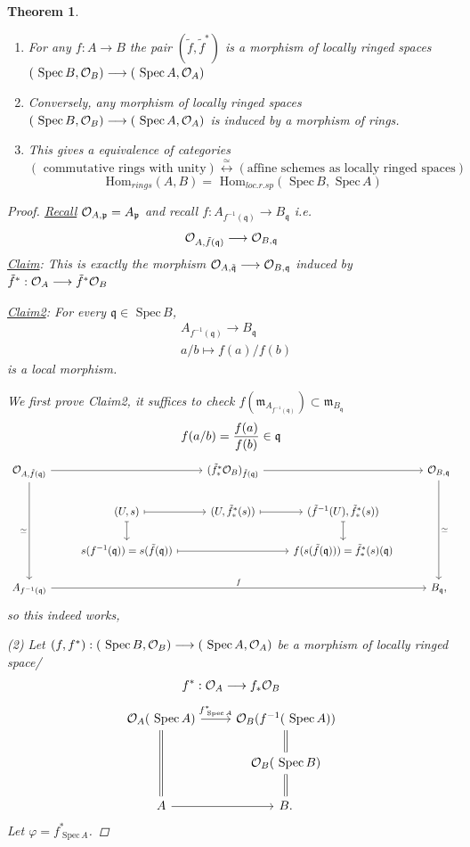 \documentclass[11pt]{article}
\newtheorem{thm}{Theorem}[section]
\renewcommand{\hom}{\text{ Hom}}
\newcommand{\spec}{\text{ Spec}\,}
\newcommand{\scm}{{\mathfrak m}}
\newcommand{\scp}{{\mathfrak p}}
\newcommand{\scq}{\mathfrak q}
\newcommand{\calo}{{\cal O}}
\newcommand{\lrta}{\longrightarrow}
\newcommand{\llrta}{\longleftrightarrow}
\begin{document}
\begin{thm}
\begin{enumerate}[label=(\arabic*)]
\item For any $f: A\lrta B$ the pair $(\tilde{f},\tilde{f}^*)$ is a morphism  of locally ringed spaces $(\spec B,\calo_B)\lrta (\spec A,\calo_A)$
\item Conversely, any morphism of locally ringed spaces $(\spec B,\calo_B)\lrta (\spec A,\calo_A)$ is induced by a morphism of rings.
\item This gives a equivalence of categories
$$
\left( \text{ commutative rings with unity}\right)\overset{\simeq}{\llrta}\left(\text{affine schemes as locally ringed spaces}\right)
$$
$$
\hom_{rings}(A,B)=\hom_{loc.r.sp}(\spec B,\spec A)
$$
\end{enumerate}
\begin{proof}
\underline{Recall} $\calo_{A,\scp}=A_\scp$ and recall $f:A_{f^{-1}(\scq)}\lrta B_\scq$ i.e.
$$
\calo_{A,\tilde{f}(\scq)}\lrta \calo_{B,\scq}
$$
\underline{Claim}: This is exactly the morphism $\calo_{A,\tilde{\scq}}\lrta \calo_{B,\scq}$ induced by $\tilde{f}^*:\calo_A\lrta \tilde{f}^*\calo_B$

\underline{Claim2}: For every $\scq\in\spec B$, 
$$
\begin{aligned}
& A_{f^{-1}(\scq)}\lrta B_\scq\\
&a/b\longmapsto f(a)/f(b)
\end{aligned}
$$
is a local morphism.

We first prove Claim2, it suffices to check $f(\scm_{A_{f^{-1}(\scq)}})\subset \scm_{B_\scq}$
$$
f(a/b)=\frac{f(a)}{f(b)}\in \scq\\
$$
$$
\begin{tikzcd}
\calo_{A,\tilde{f}(\scq)} \arrow[ddd, "\simeq"'] \arrow[rr] &  & (\tilde{f}^*_*\calo_B)_{\tilde{f}(\scq)} \arrow[rr] &  & \calo_{B,\scq} \arrow[ddd, "\simeq"] \\
 & (U,s) \arrow[d, maps to] \arrow[r, maps to] & (U,\tilde{f}^*_*(s)) \arrow[r, maps to] & (\tilde{f}^{-1}(U),\tilde{f}_*^*(s)) \arrow[d, maps to] &  \\
 & s(f^{-1}(\scq))=s(\tilde{f}(\scq)) \arrow[rr, maps to] &  & f(s(\tilde{f}(\scq)))=\tilde{f}^*_*(s)(\scq) &  \\
A_{f^{-1}(\scq)} \arrow[rrrr, "f"] &  &  &  & B_\scq,
\end{tikzcd}
$$
so this indeed works,

(2) Let $(f,f^*):(\spec B,\calo_B)\lrta (\spec A,\calo_A)$ be a  morphism of locally ringed space/ 
$$
f^*:\calo_A\lrta f_*\calo_B
$$
$$
\begin{tikzcd}
\calo_A(\spec A) \arrow[dd, equal] \arrow[r, "f^*_{\spec A}"] & \calo_B(f^{-1}(\spec A)) \arrow[d,equal] \\
 & \calo_B(\spec B) \arrow[d,equal] \\
A \arrow[r] & B.
\end{tikzcd}
$$
Let $\varphi=f^*_{\spec A}$.


\end{proof}
\end{thm}
\end{document}
